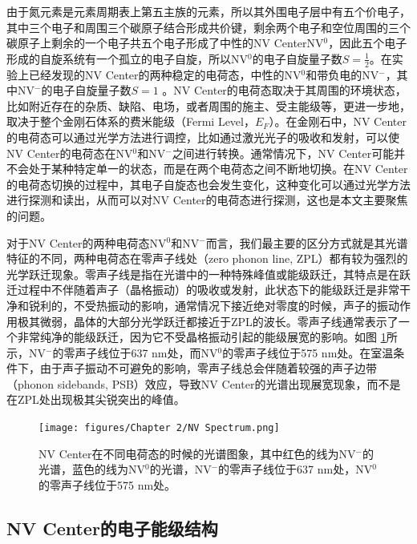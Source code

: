 \documentclass[type = bachelor, oneside]{whu-thesis}
\begin{document}
由于氮元素是元素周期表上第五主族的元素，所以其外围电子层中有五个价电子，其中三个电子和周围三个碳原子结合形成共价键，剩余两个电子和空位周围的三个碳原子上剩余的一个电子共五个电子形成了中性的NV CenterNV$^0$，因此五个电子形成的自旋系统有一个孤立的电子自旋，所以NV$^0$的电子自旋量子数$S=\frac{1}{2}$。在实验上已经发现的NV Center的两种稳定的电荷态，中性的NV$^0$和带负电的NV$^-$，其中NV$^-$的电子自旋量子数$S=1$ \cite{Waldherr2011,Aslam2013,Dolde2014}。NV Center的电荷态取决于其周围的环境状态，比如附近存在的杂质、缺陷、电场，或者周围的施主、受主能级等，更进一步地，取决于整个金刚石体系的费米能级（Fermi Level，$E_F$）\cite{Doherty2013}。在金刚石中，NV Center的电荷态可以通过光学方法进行调控，比如通过激光光子的吸收和发射，可以使NV Center的电荷态在NV$^0$和NV$^-$之间进行转换\cite{Doi2016,Siyushev2013,Shields2015}。通常情况下，NV Center可能并不会处于某种特定单一的状态，而是在两个电荷态之间不断地切换。在NV Center的电荷态切换的过程中，其电子自旋态也会发生变化，这种变化可以通过光学方法进行探测和读出，从而可以对NV Center的电荷态进行探测，这也是本文主要聚焦的问题。

对于NV Center的两种电荷态NV$^0$和NV$^-$而言，我们最主要的区分方式就是其光谱特征的不同，两种电荷态在零声子线处（zero phonon line, ZPL）都有较为强烈的光学跃迁现象。零声子线是指在光谱中的一种特殊峰值或能级跃迁，其特点是在跃迁过程中不伴随着声子（晶格振动）的吸收或发射，此状态下的能级跃迁是非常干净和锐利的，不受热振动的影响，通常情况下接近绝对零度的时候，声子的振动作用极其微弱，晶体的大部分光学跃迁都接近于ZPL的波长。零声子线通常表示了一个非常纯净的能级跃迁，因为它不受晶格振动引起的能级展宽的影响。如图 \ref{fig: NV Spectrum}所示，NV$^-$的零声子线位于637 nm处，而NV$^0$的零声子线位于575 nm处。在室温条件下，由于声子振动不可避免的影响，零声子线总会伴随着较强的声子边带（phonon sidebands, PSB）效应，导致NV Center的光谱出现展宽现象，而不是在ZPL处出现极其尖锐突出的峰值。

\begin{figure}
  \centering
  \texttt{[image: figures/Chapter 2/NV Spectrum.png]}
  \caption[NV Center在不同电荷态的时候的光谱图象]{NV Center在不同电荷态的时候的光谱图象，其中红色的线为NV$^-$的光谱，蓝色的线为NV$^0$的光谱，NV$^-$的零声子线位于637 nm处，NV$^0$的零声子线位于575 nm处\cite{Karaveli2016}。}
  \label{fig: NV Spectrum}
\end{figure}

\subsection{NV Center的电子能级结构}
\end{document}
